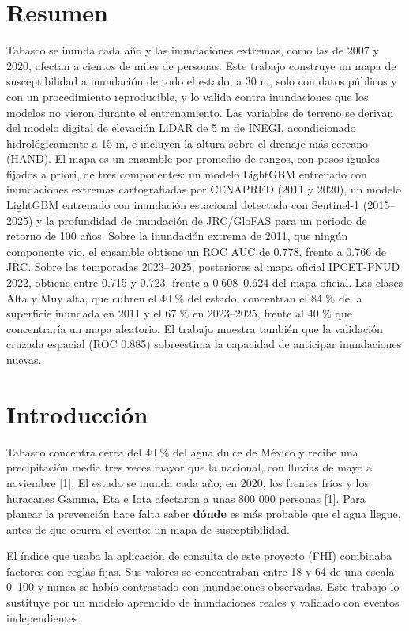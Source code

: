 \section*{Resumen}

Tabasco se inunda cada año y las inundaciones extremas, como las de 2007 y 2020, afectan a cientos de miles de personas. Este trabajo construye un mapa de susceptibilidad a inundación de todo el estado, a 30 m, solo con datos públicos y con un procedimiento reproducible, y lo valida contra inundaciones que los modelos no vieron durante el entrenamiento. Las variables de terreno se derivan del modelo digital de elevación LiDAR de 5 m de INEGI, acondicionado hidrológicamente a 15 m, e incluyen la altura sobre el drenaje más cercano (HAND). El mapa es un ensamble por promedio de rangos, con pesos iguales fijados a priori, de tres componentes: un modelo LightGBM entrenado con inundaciones extremas cartografiadas por CENAPRED (2011 y 2020), un modelo LightGBM entrenado con inundación estacional detectada con Sentinel-1 (2015--2025) y la profundidad de inundación de JRC/GloFAS para un periodo de retorno de 100 años. Sobre la inundación extrema de 2011, que ningún componente vio, el ensamble obtiene un ROC AUC de 0.778, frente a 0.766 de JRC. Sobre las temporadas 2023--2025, posteriores al mapa oficial IPCET-PNUD 2022, obtiene entre 0.715 y 0.723, frente a 0.608--0.624 del mapa oficial. Las clases Alta y Muy alta, que cubren el 40 \% del estado, concentran el 84 \% de la superficie inundada en 2011 y el 67 \% en 2023--2025, frente al 40 \% que concentraría un mapa aleatorio. El trabajo muestra también que la validación cruzada espacial (ROC 0.885) sobreestima la capacidad de anticipar inundaciones nuevas.

\section{Introducción}

Tabasco concentra cerca del 40 \% del agua dulce de México y recibe una precipitación media tres veces mayor que la nacional, con lluvias de mayo a noviembre {[}1{]}. El estado se inunda cada año; en 2020, los frentes fríos y los huracanes Gamma, Eta e Iota afectaron a unas 800 000 personas {[}1{]}. Para planear la prevención hace falta saber \textbf{dónde} es más probable que el agua llegue, antes de que ocurra el evento: un mapa de susceptibilidad.

El índice que usaba la aplicación de consulta de este proyecto (FHI) combinaba factores con reglas fijas. Sus valores se concentraban entre 18 y 64 de una escala 0--100 y nunca se había contrastado con inundaciones observadas. Este trabajo lo sustituye por un modelo aprendido de inundaciones reales y validado con eventos independientes.

